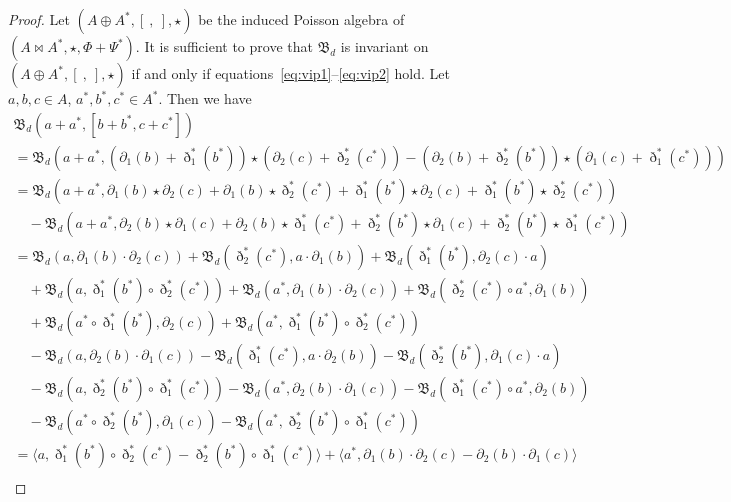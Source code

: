 \documentclass[10pt,a4paper]{amsart}
\numberwithin{equation}{section}
\begin{document}
\begin{proof} Let $(A \oplus A^*, [\ ,\ ], \star)$ be the induced Poisson algebra of $(A \bowtie A^*, \star, \Phi + \Psi^*)$.
 It is sufficient to prove that
 $\mathfrak{B}_d$ is invariant on $(A \oplus A^*, [\ ,\ ], \star)$
 if and only if equations~\eqref{eq:vip1}--\eqref{eq:vip2} hold.
 Let $a, b, c \in A$, $a^*, b^*, c^* \in A^*$.
 Then we have
 \begin{gather*}
 \mathfrak{B}_d(a + a^*, [b + b^*, c + c^*]) \\
 = \mathfrak{B}_d(a + a^*, (\partial_1(b)+\eth_1^{*}(b^*))\star(\partial_2(c)+\eth_2^{*}(c^*)) - (\partial_2(b)+\eth_2^{*}(b^*))\star(\partial_1(c)+\eth_1^{*}(c^*))) \\
 =\mathfrak{B}_d(a + a^*, \partial_1(b) \star \partial_2(c) + \partial_1(b) \star \eth_2^{*}(c^*) + \eth_1^{*}(b^*) \star \partial_2(c) + \eth_1^{*}(b^*) \star \eth_2^{*}(c^*))\\
 \quad {}- \mathfrak{B}_d(a + a^*, \partial_2(b) \star \partial_1(c) + \partial_2(b) \star \eth_1^{*}(c^*) + \eth_2^{*}(b^*) \star \partial_1(c) + \eth_2^{*}(b^*) \star \eth_1^{*}(c^*)) \\
 = \mathfrak{B}_d(a, \partial_1(b) \cdot \partial_2(c)) + \mathfrak{B}_d( \eth_2^{*}(c^*), a \cdot \partial_1(b)) + \mathfrak{B}_d( \eth_1^{*}(b^*), \partial_2(c) \cdot a) \\
 \quad {}+ \mathfrak{B}_d( a, \eth_1^{*}(b^*) \circ \eth_2^{*}(c^*)) + \mathfrak{B}_d( a^*, \partial_1(b) \cdot \partial_2(c) ) + \mathfrak{B}_d(\eth_2^{*}(c^*) \circ a^*, \partial_1(b)) \\
 \quad {}+ \mathfrak{B}_d(a^* \circ \eth_1^{*}(b^*),\partial_2(c)) + \mathfrak{B}_d(a^*,\eth_1^{*}(b^*) \circ \eth_2^{*}(c^*)) \\
 \quad {}- \mathfrak{B}_d(a, \partial_2(b) \cdot \partial_1(c)) - \mathfrak{B}_d( \eth_1^{*}(c^*), a \cdot \partial_2(b)) - \mathfrak{B}_d( \eth_2^{*}(b^*), \partial_1(c) \cdot a) \\
 \quad {}- \mathfrak{B}_d( a, \eth_2^{*}(b^*) \circ \eth_1^{*}(c^*)) - \mathfrak{B}_d( a^*, \partial_2(b) \cdot \partial_1(c) ) - \mathfrak{B}_d(\eth_1^{*}(c^*) \circ a^*, \partial_2(b)) \\
 \quad {}- \mathfrak{B}_d(a^* \circ \eth_2^{*}(b^*),\partial_1(c)) - \mathfrak{B}_d(a^*,\eth_2^{*}(b^*) \circ \eth_1^{*}(c^*)) \\
 = \langle a, \eth_1^{*}(b^*) \circ \eth_2^{*}(c^*) - \eth_2^{*}(b^*) \circ \eth_1^{*}(c^*) \rangle + \langle a^*, \partial_1(b) \cdot \partial_2(c) - \partial_2(b) \cdot \partial_1(c) \rangle \\

\end{gather*}
\end{proof}
\end{document}
